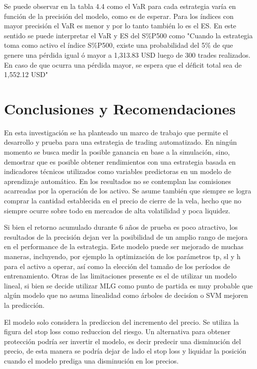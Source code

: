 \documentclass[a4paper,12pt]{Latex/Classes/PhDthesisPSnPDF}
\begin{document}
Se puede observar en la tabla 4.4 como el VaR para cada estrategia varía en función de la precisión del modelo, como es de esperar. Para los índices con mayor precisión el VaR es menor y por lo tanto también lo es el ES. En este sentido se puede interpretar el VaR y ES del S\%P500 como "Cuando la estrategia toma como activo el índice S\%P500, existe una probabilidad del 5\% de que genere una pérdida igual ó mayor a 1,313.83 USD luego de 300 trades realizados. En caso de que ocurra una pérdida mayor, se espera que el déficit total sea de 1,552.12 USD"

\chapter*{Conclusiones y Recomendaciones}

En esta investigación se ha planteado un marco de trabajo que permite el desarrollo y prueba para una estrategia de trading automatizado. En ningún momento se busca medir la posible ganancia en base a la simulación, sino, demostrar que es posible obtener rendimientos con una estrategia basada en indicadores técnicos utilizados como variables predictoras en un modelo de aprendizaje automático. En los resultados no se contemplan las comisiones acarreadas por la operación de los activo. Se asume también que siempre se logra comprar la cantidad establecida en el precio de cierre de la vela, hecho que no siempre ocurre sobre todo en mercados de alta volatilidad y poca liquidez.

Si bien el retorno acumulado durante 6 años de prueba es poco atractivo, los resultados de la precisión dejan ver la posibilidad de un amplio rango de mejora en el performance de la estrategia. Este modelo puede ser mejorado de muchas maneras, incluyendo, por ejemplo la optimización de los parámetros tp, sl y h para el activo a operar, así como la elección del tamaño de los períodos de entrenamiento. Otras de las limitaciones presente es el de utilizar un modelo lineal, si bien se decide utilizar MLG como punto de partida es muy probable que algún modelo que no asuma linealidad como árboles de decisíon o SVM mejoren la predicción. 

El modelo solo considera la prediccion del incremento del precio. Se utiliza la figura del stop loss como reduccion del riesgo. Un alternativa para obtener protección podría ser invertir el modelo, es decir predecir una disminución del precio, de esta manera se podría dejar de lado el stop loss y liquidar la posición cuando el modelo prediga una disminución en los precios.
\end{document}
